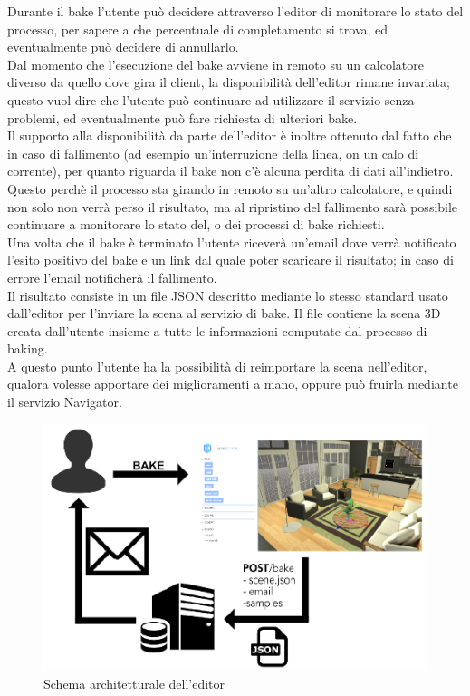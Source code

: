 Durante il bake l’utente può decidere attraverso l’editor di monitorare lo stato del processo, per sapere a che percentuale di completamento si trova, ed eventualmente può decidere di annullarlo. 
\\
Dal momento che l’esecuzione del bake avviene in remoto su un calcolatore diverso da quello dove gira il client, la disponibilità dell’editor rimane invariata; questo vuol dire che l’utente può continuare ad utilizzare il servizio senza problemi, ed eventualmente può fare richiesta di ulteriori bake. 
\\
Il supporto alla disponibilità da parte dell’editor è inoltre ottenuto dal fatto che in caso di fallimento (ad esempio un’interruzione della linea, on un calo di corrente), per quanto riguarda il bake non c’è alcuna perdita di dati all’indietro. Questo perchè il processo sta girando in remoto su un’altro calcolatore, e quindi non solo non verrà perso il risultato, ma al ripristino del fallimento sarà possibile continuare a monitorare lo stato del, o dei processi di bake richiesti.
\\
Una volta che il bake è terminato l’utente riceverà un’email dove verrà notificato l’esito positivo del bake e un link dal quale poter scaricare il risultato; in caso di errore l’email notificherà il fallimento. 
\\
Il risultato consiste in un file JSON descritto mediante lo stesso standard usato dall’editor per l’inviare la scena al servizio di bake. Il file contiene la scena 3D creata dall’utente insieme a tutte le informazioni computate dal processo di baking.
\\
A questo punto l’utente ha la possibilità di reimportare la scena nell’editor, qualora volesse apportare dei miglioramenti a mano, oppure può fruirla mediante il servizio Navigator.
\\
\begin{figure}[htb]
 \centering
 \includegraphics[width=0.8\linewidth]{images/chapter_architettura_sistema/as_editor.png}\hfill
 \caption[Schema architetturale editor]{Schema architetturale dell'editor}
 \label{fig:as_editor}
\end{figure}

